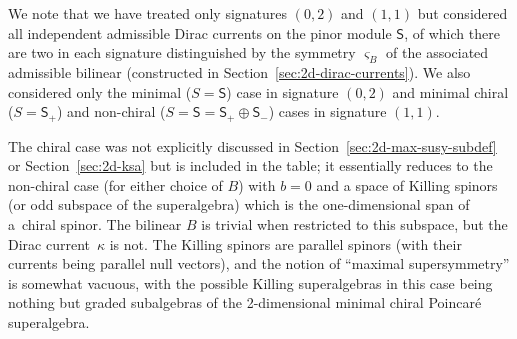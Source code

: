 \documentclass[10pt,a4paper]{amsart}
\numberwithin{equation}{section}
\newcommand{\ssS}{\mathsf{S}}
\newcommand{\1}{\mathbbm{1}}
\begin{document}
We note that we have treated only signatures $(0,2)$ and $(1,1)$ but considered all independent admissible Dirac currents on the pinor module $\ssS$, of which there are two in each signature distinguished by the symmetry $\varsigma_B$ of the associated admissible bilinear (constructed in Section~\ref{sec:2d-dirac-currents}). We also considered only the minimal ($S=\ssS$) case in signature $(0,2)$ and minimal chiral ($S=\ssS_+$) and non-chiral ($S=\ssS=\ssS_+\oplus\ssS_-$) cases in signature $(1,1)$.

The chiral case was not explicitly discussed in Section~\ref{sec:2d-max-susy-subdef} or Section~\ref{sec:2d-ksa} but is included in the table; it essentially reduces to the non-chiral case (for either choice of $B$) with $b=0$ and a space of Killing spinors (or odd subspace of the superalgebra) which is the one-dimensional span of a~chiral spinor. The bilinear $B$ is trivial when restricted to this subspace, but the Dirac current~$\kappa$ is not. The Killing spinors are parallel spinors (with their currents being parallel null vectors), and the notion of ``maximal supersymmetry'' is somewhat vacuous, with the possible Killing superalgebras in this case being nothing but graded subalgebras of the 2-dimensional minimal chiral Poincar\'e superalgebra.
\end{document}
